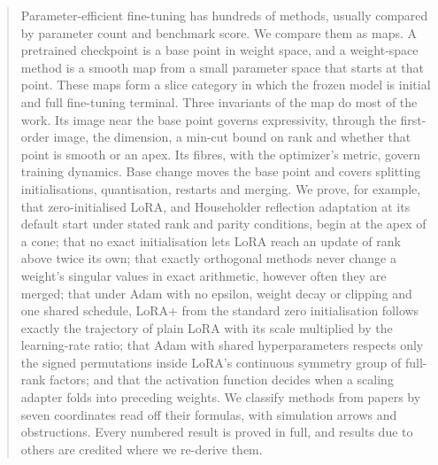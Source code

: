 \begin{abstract}
Parameter-efficient fine-tuning has hundreds of methods, usually compared by parameter count and benchmark score. We compare them as maps. A pretrained checkpoint is a base point in weight space, and a weight-space method is a smooth map from a small parameter space that starts at that point. These maps form a slice category in which the frozen model is initial and full fine-tuning terminal. Three invariants of the map do most of the work. Its image near the base point governs expressivity, through the first-order image, the dimension, a min-cut bound on rank and whether that point is smooth or an apex. Its fibres, with the optimizer's metric, govern training dynamics. Base change moves the base point and covers splitting initialisations, quantisation, restarts and merging. We prove, for example, that zero-initialised LoRA, and Householder reflection adaptation at its default start under stated rank and parity conditions, begin at the apex of a cone; that no exact initialisation lets LoRA reach an update of rank above twice its own; that exactly orthogonal methods never change a weight's singular values in exact arithmetic, however often they are merged; that under Adam with no epsilon, weight decay or clipping and one shared schedule, LoRA+ from the standard zero initialisation follows exactly the trajectory of plain LoRA with its scale multiplied by the learning-rate ratio; that Adam with shared hyperparameters respects only the signed permutations inside LoRA's continuous symmetry group of full-rank factors; and that the activation function decides when a scaling adapter folds into preceding weights. We classify \nMethods{} methods from \nPapers{} papers by seven coordinates read off their formulas, with \nArrows{} simulation arrows and \nObstructions{} obstructions. Every numbered result is proved in full, and results due to others are credited where we re-derive them.
\end{abstract}
